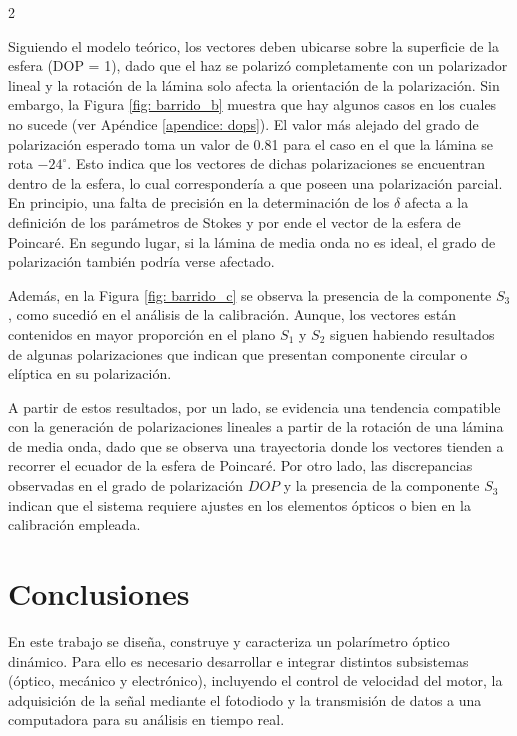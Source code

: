 \documentclass[11pt,a4paper]{article}
\begin{document}
\begin{multicols}{2}

Siguiendo el modelo teórico, los vectores deben ubicarse sobre la superficie de la esfera (DOP = 1), dado que el haz se polarizó completamente con un polarizador lineal y la rotación de la lámina solo afecta la orientación de la polarización. Sin embargo, la Figura \ref{fig: barrido_b} muestra que hay algunos casos en los cuales no sucede (ver Apéndice \ref{apendice: dops}). El valor más alejado del grado de polarización esperado toma un valor de 0.81 para el caso en el que la lámina se rota $-24^\circ$. Esto indica que los vectores de dichas polarizaciones se encuentran dentro de la esfera, lo cual correspondería a que poseen una polarización parcial. En principio, una falta de precisión en la determinación de los $\delta$ afecta a la definición de los parámetros de Stokes y por ende el vector de la esfera de Poincaré. En segundo lugar, si la lámina de media onda no es ideal, el grado de polarización también podría verse afectado.

Además, en la Figura \ref{fig: barrido_c} se observa la presencia de la componente $S_3$, como sucedió en el análisis de la calibración. Aunque, los vectores están contenidos en mayor proporción en el plano $S_1$ y $S_2$ siguen habiendo resultados de algunas polarizaciones que indican que presentan componente circular o elíptica en su polarización.

A partir de estos resultados, por un lado, se evidencia una tendencia compatible con la generación de polarizaciones lineales a partir de la rotación de una lámina de media onda, dado que se observa una trayectoria donde los vectores tienden a recorrer el ecuador de la esfera de Poincaré. Por otro lado, las discrepancias observadas en el grado de polarización $DOP$ y la presencia de la componente $S_3$ indican que el sistema requiere ajustes en los elementos ópticos o bien en la calibración empleada.


\section{Conclusiones}
En este trabajo se diseña, construye y caracteriza un polarímetro óptico dinámico. Para ello es necesario desarrollar e integrar distintos subsistemas (óptico, mecánico y electrónico), incluyendo el control de velocidad del motor, la adquisición de la señal mediante el fotodiodo y la transmisión de datos a una computadora para su análisis en tiempo real. 


\end{multicols}
\end{document}
